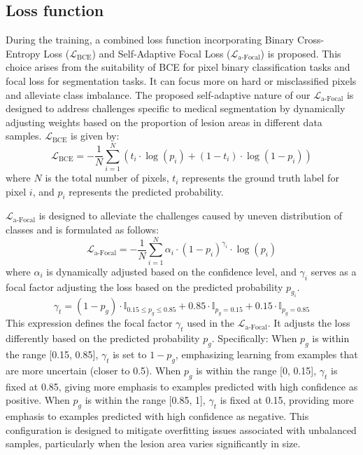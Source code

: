 \documentclass[review]{elsarticle}
\begin{document}
	\subsection{Loss function}
	During the training, a combined loss function incorporating Binary Cross-Entropy Loss (\(\mathcal{L}_\text{BCE}\)) and Self-Adaptive Focal Loss (\(\mathcal{L}_\text{a-Focal}\)) is proposed. This choice arises from the suitability of BCE for pixel binary classification tasks and focal loss for segmentation tasks. It can focus more on hard or misclassified pixels and alleviate class imbalance. The proposed self-adaptive nature of our \(\mathcal{L}_\text{a-Focal}\) is designed to address challenges specific to medical segmentation by dynamically adjusting weights based on the proportion of lesion areas in different data samples.
	\(\mathcal{L}_\text{BCE}\) is given by:
	\begin{equation}
		\mathcal{L}_\text{BCE} = -\frac{1}{N} \sum_{i=1}^{N} \left(t_i \cdot \log(p_i) + (1 - t_i) \cdot \log(1 - p_i)\right)
	\end{equation}
	where \(N\) is the total number of pixels, \(t_i\) represents the ground truth label for pixel \(i\), and \(p_i\) represents the predicted probability.
	
	\(\mathcal{L}_\text{a-Focal}\) is designed to alleviate the challenges caused by uneven distribution of classes and is formulated as follows:
	\begin{equation}
		\mathcal{L}_\text{a-Focal} = -\frac{1}{N} \sum_{i=1}^{N} \alpha_i \cdot (1 - p_i)^{\gamma_i} \cdot \log(p_i)
	\end{equation}
	where \(\alpha_i\) is dynamically adjusted based on the confidence level, and \(\gamma_i\) serves as a focal factor adjusting the loss based on the predicted probability \(p_{g_i}\).
	\begin{equation}
		\gamma_t = (1 - p_g) \cdot \mathbb{I}_{0.15 \leq p_g \leq 0.85} + 0.85 \cdot \mathbb{I}_{p_g = 0.15} + 0.15 \cdot \mathbb{I}_{p_g = 0.85}
	\end{equation}
	This expression defines the focal factor $\gamma_t$ used in the \(\mathcal{L}_\text{a-Focal}\). It adjusts the loss differently based on the predicted probability $p_g$. Specifically: When $p_g$ is within the range [0.15, 0.85], $\gamma_t$ is set to $1 - p_g$, emphasizing learning from examples that are more uncertain (closer to 0.5). When $p_g$ is within the range [0, 0.15], $\gamma_t$ is fixed at 0.85, giving more emphasis to examples predicted with high confidence as positive. When $p_g$ is within the range [0.85, 1], $\gamma_t$ is fixed at 0.15, providing more emphasis to examples predicted with high confidence as negative. This configuration is designed to mitigate overfitting issues associated with unbalanced samples, particularly when the lesion area varies significantly in size.
	
\end{document}
